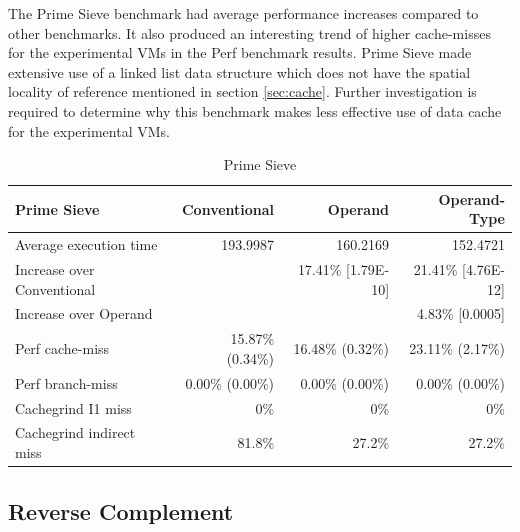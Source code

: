 \documentclass[english,a4paper,12pt]{report}
\begin{document}
The Prime Sieve benchmark had average performance increases compared
to other benchmarks. It also produced an interesting trend of higher
cache-misses for the experimental VMs in the Perf benchmark
results. Prime Sieve made extensive use of a linked list data
structure which does not have the spatial locality of reference
mentioned in section \ref{sec:cache}. Further investigation is
required to determine why this benchmark makes less effective use of
data cache for the experimental VMs.


\begin{table}[!htb]
  \begin{center}
    \begin{tabular}{lrrr}
      Prime Sieve & Conventional & Operand & Operand-Type\\
      \hline
      Average execution time & 193.9987 & 160.2169 & 152.4721\\
      Increase over Conventional &  & 17.41\% [1.79E-10] & 21.41\% [4.76E-12]\\
      Increase over Operand &  &  & 4.83\% [0.0005]\\
      Perf cache-miss & 15.87\% (0.34\%) & 16.48\% (0.32\%) & 23.11\% (2.17\%)\\
      Perf branch-miss & 0.00\% (0.00\%) & 0.00\% (0.00\%) & 0.00\% (0.00\%)\\
      Cachegrind I1 miss & 0\% & 0\% & 0\%\\
      Cachegrind indirect miss & 81.8\% & 27.2\% & 27.2\%\\
    \end{tabular}
  \end{center}
  \caption{Prime Sieve}
\end{table}

\subsection{Reverse Complement}
\end{document}
